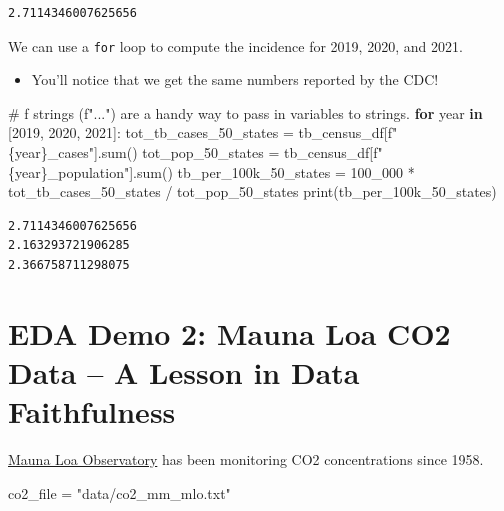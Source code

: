 \documentclass[
  letterpaper,
  DIV=11,
  numbers=noendperiod]{scrreprt}
\newenvironment{Shaded}{\begin{snugshade}}{\end{snugshade}}
\newcommand{\BuiltInTok}[1]{\textcolor[rgb]{0.00,0.23,0.31}{#1}}
\newcommand{\CommentTok}[1]{\textcolor[rgb]{0.37,0.37,0.37}{#1}}
\newcommand{\ControlFlowTok}[1]{\textcolor[rgb]{0.00,0.23,0.31}{\textbf{#1}}}
\newcommand{\DecValTok}[1]{\textcolor[rgb]{0.68,0.00,0.00}{#1}}
\newcommand{\KeywordTok}[1]{\textcolor[rgb]{0.00,0.23,0.31}{\textbf{#1}}}
\newcommand{\NormalTok}[1]{\textcolor[rgb]{0.00,0.23,0.31}{#1}}
\newcommand{\OperatorTok}[1]{\textcolor[rgb]{0.37,0.37,0.37}{#1}}
\newcommand{\SpecialCharTok}[1]{\textcolor[rgb]{0.37,0.37,0.37}{#1}}
\newcommand{\SpecialStringTok}[1]{\textcolor[rgb]{0.13,0.47,0.30}{#1}}
\newcommand{\StringTok}[1]{\textcolor[rgb]{0.13,0.47,0.30}{#1}}
\providecommand{\tightlist}{%
  \setlength{\itemsep}{0pt}\setlength{\parskip}{0pt}}\usepackage{longtable,booktabs,array}
\begin{document}
\begin{verbatim}
2.7114346007625656
\end{verbatim}

We can use a \texttt{for} loop to compute the incidence for 2019, 2020,
and 2021.

\begin{itemize}
\tightlist
\item
  You'll notice that we get the same numbers reported by the CDC!
\end{itemize}

\begin{Shaded}
\begin{Highlighting}[]
\CommentTok{\# f strings (f"...") are a handy way to pass in variables to strings.}
\ControlFlowTok{for}\NormalTok{ year }\KeywordTok{in}\NormalTok{ [}\DecValTok{2019}\NormalTok{, }\DecValTok{2020}\NormalTok{, }\DecValTok{2021}\NormalTok{]:}
\NormalTok{  tot\_tb\_cases\_50\_states }\OperatorTok{=}\NormalTok{ tb\_census\_df[}\SpecialStringTok{f"}\SpecialCharTok{\{}\NormalTok{year}\SpecialCharTok{\}}\SpecialStringTok{\_cases"}\NormalTok{].}\BuiltInTok{sum}\NormalTok{()}
\NormalTok{  tot\_pop\_50\_states }\OperatorTok{=}\NormalTok{ tb\_census\_df[}\SpecialStringTok{f"}\SpecialCharTok{\{}\NormalTok{year}\SpecialCharTok{\}}\SpecialStringTok{\_population"}\NormalTok{].}\BuiltInTok{sum}\NormalTok{()}
\NormalTok{  tb\_per\_100k\_50\_states }\OperatorTok{=} \DecValTok{100\_000} \OperatorTok{*}\NormalTok{ tot\_tb\_cases\_50\_states }\OperatorTok{/}\NormalTok{ tot\_pop\_50\_states}
  \BuiltInTok{print}\NormalTok{(tb\_per\_100k\_50\_states)}
\end{Highlighting}
\end{Shaded}

\begin{verbatim}
2.7114346007625656
2.163293721906285
2.366758711298075
\end{verbatim}

\section{EDA Demo 2: Mauna Loa CO2 Data -- A Lesson in Data
Faithfulness}\label{eda-demo-2-mauna-loa-co2-data-a-lesson-in-data-faithfulness}

\href{https://gml.noaa.gov/ccgg/trends/data.html}{Mauna Loa Observatory}
has been monitoring CO2 concentrations since 1958.

\begin{Shaded}
\begin{Highlighting}[]
\NormalTok{co2\_file }\OperatorTok{=} \StringTok{"data/co2\_mm\_mlo.txt"}
\end{Highlighting}
\end{Shaded}
\end{document}
